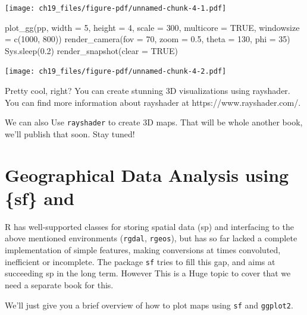 \documentclass[
  letterpaper,
  DIV=11,
  numbers=noendperiod]{scrreprt}
\newenvironment{Shaded}{\begin{snugshade}}{\end{snugshade}}
\newcommand{\AttributeTok}[1]{\textcolor[rgb]{0.40,0.45,0.13}{#1}}
\newcommand{\ConstantTok}[1]{\textcolor[rgb]{0.56,0.35,0.01}{#1}}
\newcommand{\DecValTok}[1]{\textcolor[rgb]{0.68,0.00,0.00}{#1}}
\newcommand{\FloatTok}[1]{\textcolor[rgb]{0.68,0.00,0.00}{#1}}
\newcommand{\FunctionTok}[1]{\textcolor[rgb]{0.28,0.35,0.67}{#1}}
\newcommand{\NormalTok}[1]{\textcolor[rgb]{0.00,0.23,0.31}{#1}}
\begin{document}
\texttt{[image: ch19\_files/figure-pdf/unnamed-chunk-4-1.pdf]}

\begin{Shaded}
\begin{Highlighting}[]
\FunctionTok{plot\_gg}\NormalTok{(pp, }\AttributeTok{width =} \DecValTok{5}\NormalTok{, }\AttributeTok{height =} \DecValTok{4}\NormalTok{, }\AttributeTok{scale =} \DecValTok{300}\NormalTok{, }\AttributeTok{multicore =} \ConstantTok{TRUE}\NormalTok{, }\AttributeTok{windowsize =} \FunctionTok{c}\NormalTok{(}\DecValTok{1000}\NormalTok{, }\DecValTok{800}\NormalTok{))}
\FunctionTok{render\_camera}\NormalTok{(}\AttributeTok{fov =} \DecValTok{70}\NormalTok{, }\AttributeTok{zoom =} \FloatTok{0.5}\NormalTok{, }\AttributeTok{theta =} \DecValTok{130}\NormalTok{, }\AttributeTok{phi =} \DecValTok{35}\NormalTok{)}
\FunctionTok{Sys.sleep}\NormalTok{(}\FloatTok{0.2}\NormalTok{)}
\FunctionTok{render\_snapshot}\NormalTok{(}\AttributeTok{clear =} \ConstantTok{TRUE}\NormalTok{)}
\end{Highlighting}
\end{Shaded}

\texttt{[image: ch19\_files/figure-pdf/unnamed-chunk-4-2.pdf]}

Pretty cool, right? You can create stunning 3D visualizations using
rayshader. You can find more information about rayshader at
https://www.rayshader.com/.

We can also Use \texttt{rayshader} to create 3D maps. That will be whole
another book, we'll publish that soon. Stay tuned!


\chapter{Geographical Data Analysis using \{sf\}
and}\label{geographical-data-analysis-using-sf-and}

R has well-supported classes for storing spatial data (sp) and
interfacing to the above mentioned environments (\texttt{rgdal},
\texttt{rgeos}), but has so far lacked a complete implementation of
simple features, making conversions at times convoluted, inefficient or
incomplete. The package \texttt{sf} tries to fill this gap, and aims at
succeeding sp in the long term. However This is a Huge topic to cover
that we need a separate book for this.

We'll just give you a brief overview of how to plot maps using
\texttt{sf} and \texttt{ggplot2}.
\end{document}
